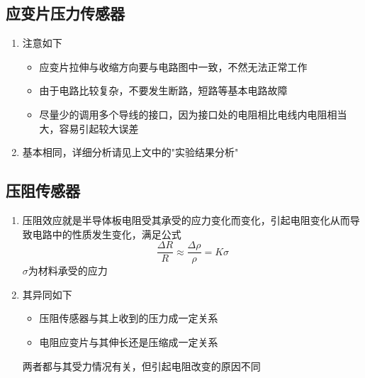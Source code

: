 \documentclass[a4paper,UTF8]{ctexart}
\begin{document}
\subsection*{应变片压力传感器}
    \begin{enumerate}
        \item 注意如下
        \begin{itemize}
            \item 应变片拉伸与收缩方向要与电路图中一致，不然无法正常工作
            \item 由于电路比较复杂，不要发生断路，短路等基本电路故障
            \item 尽量少的调用多个导线的接口，因为接口处的电阻相比电线内电阻相当大，容易引起较大误差
        \end{itemize}
        \item 基本相同，详细分析请见上文中的"实验结果分析"
    \end{enumerate}
\subsection*{压阻传感器}
    \begin{enumerate}
        \item 压阻效应就是半导体板电阻受其承受的应力变化而变化，引起电阻变化从而导致电路中的性质发生变化，满足公式
        \begin{equation*}
            \frac{\Delta R}{R}\approx\frac{\Delta \rho}{\rho}=K\sigma
        \end{equation*}
            $\sigma$为材料承受的应力
        \item 其异同如下
        \begin{itemize}
            \item 压阻传感器与其上收到的压力成一定关系
            \item 电阻应变片与其伸长还是压缩成一定关系
        \end{itemize}
            两者都与其受力情况有关，但引起电阻改变的原因不同
    \end{enumerate}

\label{lastpage}
\end{document}
